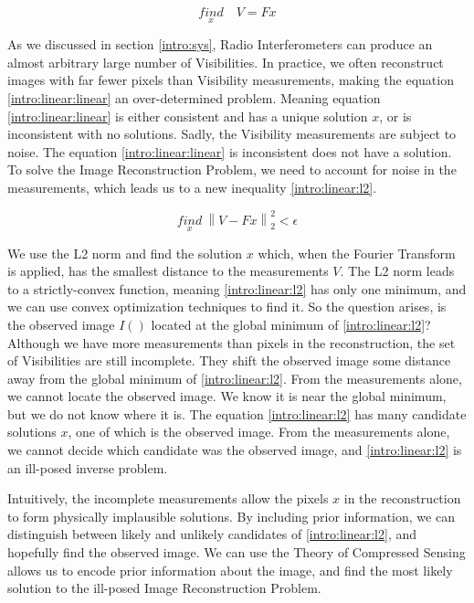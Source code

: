 \begin{equation}\label{intro:linear:linear}
\underset{x}{find}\quad V = Fx
\end{equation}

As we discussed in section \ref{intro:sys}, Radio Interferometers can produce an almost arbitrary large number of Visibilities. In practice, we often reconstruct images with far fewer pixels than Visibility measurements, making the equation \eqref{intro:linear:linear} an over-determined problem. Meaning equation \eqref{intro:linear:linear} is either consistent and has a unique solution $x$, or is inconsistent with no solutions. Sadly, the Visibility measurements are subject to noise. The equation \eqref{intro:linear:linear} is inconsistent does not have a solution. To solve the Image Reconstruction Problem, we need to account for noise in the measurements, which leads us to a new inequality \eqref{intro:linear:l2}.

\begin{equation}\label{intro:linear:l2}
\underset{x}{find} \: \left \| V - Fx \right \|_2^2 < \epsilon
\end{equation}

We use the L2 norm and find the solution $x$ which, when the Fourier Transform is applied, has the smallest distance to the measurements $V$. The L2 norm leads to a strictly-convex function, meaning \eqref{intro:linear:l2} has only one minimum, and we can use convex optimization techniques to find it. So the question arises, is the observed image $I()$ located at the global minimum of \eqref{intro:linear:l2}? Although we have more measurements than pixels in the reconstruction, the set of Visibilities are still incomplete. They shift the observed image some distance away from the global minimum of \eqref{intro:linear:l2}. From the measurements alone, we cannot locate the observed image. We know it is near the global minimum, but we do not know where it is. The equation \eqref{intro:linear:l2} has many candidate solutions $x$, one of which is the observed image.  From the measurements alone, we cannot decide which candidate was the observed image, and \eqref{intro:linear:l2} is an ill-posed inverse problem. 

Intuitively, the incomplete measurements allow the pixels $x$ in the reconstruction to form physically implausible solutions. By including prior information, we can distinguish between likely and unlikely candidates of \eqref{intro:linear:l2}, and hopefully find the observed image. We can use the Theory of Compressed Sensing allows us to encode prior information about the image, and find the most likely solution to the ill-posed Image Reconstruction Problem.

